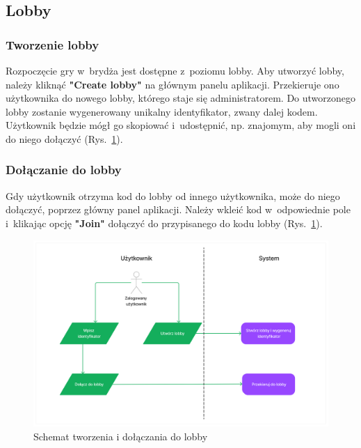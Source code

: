 \FloatBarrier

\subsection{Lobby}
\subsubsection{Tworzenie lobby}

Rozpoczęcie gry w~brydża jest dostępne z~poziomu lobby. Aby utworzyć
lobby, należy kliknąć \textbf{"Create lobby"} na głównym panelu
aplikacji. Przekieruje ono użytkownika do nowego lobby, którego staje
się administratorem. Do utworzonego lobby zostanie wygenerowany
unikalny identyfikator, zwany dalej kodem. Użytkownik będzie mógł go skopiować
i~udostępnić, np. znajomym, aby mogli oni do niego dołączyć (Rys.~\ref{fig:schemat_create_join_lobby}).

\subsubsection{Dołączanie do lobby}

Gdy użytkownik otrzyma kod do lobby od innego użytkownika, może
do niego dołączyć, poprzez główny panel aplikacji. Należy wkleić
kod w~odpowiednie pole i~klikając opcję \textbf{"Join"}
dołączyć do przypisanego do kodu lobby (Rys.~\ref{fig:schemat_create_join_lobby}).

\begin{figure}[h]
  \centering
  \includegraphics[width=\textwidth]{img/schematy/create_join_lobby.png}
  \caption{Schemat tworzenia i dołączania do lobby}
  \label{fig:schemat_create_join_lobby}
\end{figure}

